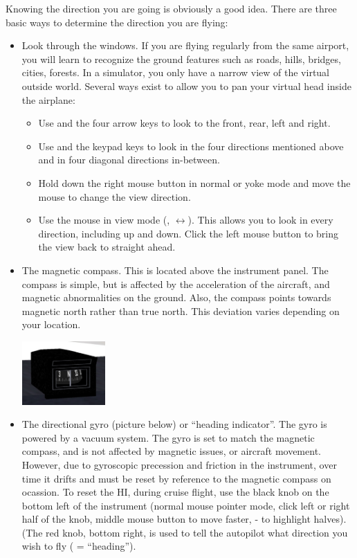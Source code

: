 Knowing the direction you are going is obviously a good idea. There are three
basic ways to determine the direction you are flying:
\begin{itemize}
    \item Look through the windows. If you are flying regularly from the same
  airport, you will learn to recognize the ground features such as roads, hills,
  bridges, cities, forests. In a simulator, you only have a narrow view of the
  virtual outside world. Several ways exist to allow you to pan your virtual
  head inside the airplane:
      \begin{itemize}
        \item Use  and the four arrow keys to
      look to the front, rear, left and right.
        \item Use  and the keypad keys to look in the
      four directions mentioned above and in four diagonal directions
      in-between.
        \item Hold down the right mouse button in normal or yoke mode and move
        the  mouse to change the view direction.
        \item Use the mouse in view mode (, $\leftrightarrow$). This
      allows you to look in every direction, including up and down. Click the
      left mouse button to bring the view back to straight ahead.
    \end{itemize}
 \item The magnetic compass. This is located above the instrument panel. The
 compass is simple, but is affected by the acceleration of the aircraft, and
 magnetic abnormalities on the ground. Also, the compass points towards magnetic
 north rather than true north. This deviation varies depending on your location.

\begin{center}
\includegraphics[width=0.25\textwidth]{img/tut_36}
\end{center}


  \item The directional gyro (picture below) or ``heading indicator''. The
  gyro is powered by a vacuum system. The gyro is set to match the magnetic
  compass, and is not affected by magnetic issues, or aircraft movement.
  However, due to gyroscopic precession and friction in the instrument, over
  time it drifts and must be reset by reference to the magnetic compass on
  ocassion. To reset the HI, during cruise flight, use the black knob on the
  bottom left of the instrument
  (normal mouse pointer mode, click left or right half of the knob, middle
  mouse button to move faster, - to highlight halves).
  (The red knob, bottom right, is used to tell the autopilot what direction
  you wish to fly (\textcolor{red}{} = ``heading'').


\end{itemize}

